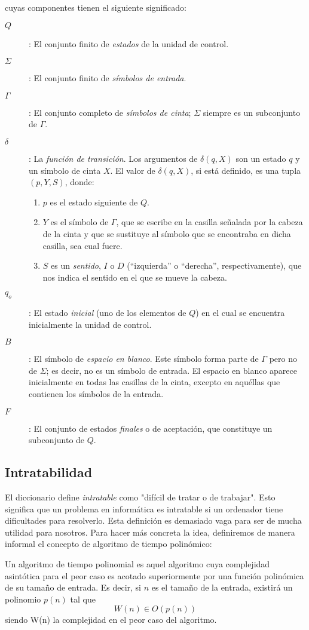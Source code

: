 cuyas componentes tienen el siguiente significado:\\
\begin{description}
\item[$Q$]: El conjunto finito de \emph{estados} de la unidad de control.
\item[$\Sigma$]: El conjunto finito de \emph{símbolos de entrada}.
\item[$\Gamma$]: El conjunto completo de \emph{símbolos de cinta}; $\Sigma$ siempre es un subconjunto de $\Gamma$.
\item[$\delta$]: \quad La \emph{función de transición}. Los argumentos de $\delta(q,X)$ son un estado $q$ y un símbolo de cinta $X$. El valor de $\delta(q,X)$, si está definido, es una tupla $(p,Y,S)$, donde:
  \begin{enumerate}
  \item $p$ es el estado siguiente de $Q$.
  \item $Y$ es el símbolo de $\Gamma$, que se escribe en la casilla señalada por la cabeza de la cinta y que se sustituye al símbolo que se encontraba en dicha casilla, sea cual fuere.
  \item $S$ es un \emph{sentido}, $I$ o $D$ (``izquierda'' o ``derecha'', respectivamente), que nos indica el sentido en el que se mueve la cabeza.
  \end{enumerate}
\item[$q_o$]: El estado \emph{inicial} (uno de los elementos de $Q$) en el cual se encuentra inicialmente la unidad de control.
\item[$B$]: El símbolo de \emph{espacio en blanco}. Este símbolo forma parte de $\Gamma$ pero no de $\Sigma$; es decir, no es un símbolo de entrada. El espacio en blanco aparece inicialmente en todas las casillas de la cinta, excepto en aquéllas que contienen los símbolos de la entrada.
\item[$F$]: El conjunto de estados \emph{finales} o de aceptación, que constituye un subconjunto de $Q$.
\end{description}

\subsection{Intratabilidad}
\label{sec:intratabilidad}

El diccionario define \emph{intratable} como "difícil de tratar o de trabajar". Esto significa que un problema en informática es intratable si un ordenador tiene dificultades para resolverlo. Esta definición es demasiado vaga para ser de mucha utilidad para nosotros. Para hacer más concreta la idea, definiremos de manera informal el concepto de algoritmo de tiempo polinómico:\\
\begin{fondo}
Un algoritmo de tiempo polinomial es aquel algoritmo cuya complejidad asintótica para el peor caso es acotado superiormente por una función polinómica de su tamaño de entrada. Es decir, si $n$ es el tamaño de la entrada, existirá un polinomio $p(n)$ tal que
\[ W(n) \in O(p(n)) \]
siendo W(n) la complejidad en el peor caso del algoritmo.
\end{fondo}

